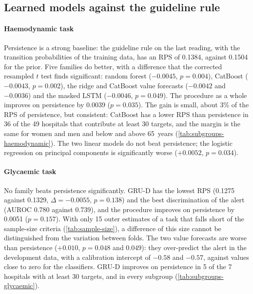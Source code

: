 


\subsection{Learned models against the guideline rule}

\paragraph{Haemodynamic task} Persistence is a strong baseline: the guideline rule on the last reading, with the transition probabilities of the training data, has an RPS of 0.1384, against 0.1504 for the prior. Five families do better, with a difference that the corrected resampled $t$ test finds significant: random forest ($-0.0045$, $p = 0.004$), CatBoost ($-0.0043$, $p = 0.002$), the ridge and CatBoost value forecasts ($-0.0042$ and $-0.0036$) and the masked LSTM ($-0.0046$, $p = 0.049$). The procedure as a whole improves on persistence by 0.0039 ($p = 0.035$). The gain is small, about 3\% of the RPS of persistence, but consistent: CatBoost has a lower RPS than persistence in 36 of the 49 hospitals that contribute at least 30 targets, and the margin is the same for women and men and below and above 65~years (\cref{tab:subgroups-haemodynamic}). The two linear models do not beat persistence; the logistic regression on principal components is significantly worse ($+0.0052$, $p = 0.034$).

\paragraph{Glycaemic task} No family beats persistence significantly. GRU-D has the lowest RPS (0.1275 against 0.1329, $\Delta = -0.0055$, $p = 0.138$) and the best discrimination of the alert (AUROC 0.780 against 0.739), and the procedure improves on persistence by 0.0051 ($p = 0.157$). With only 15 outer estimates of a task that falls short of the sample-size criteria (\cref{tab:sample-size}), a difference of this size cannot be distinguished from the variation between folds. The two value forecasts are worse than persistence ($+0.010$, $p = 0.048$ and $0.049$): they over-predict the alert in the development data, with a calibration intercept of $-0.58$ and $-0.57$, against values close to zero for the classifiers. GRU-D improves on persistence in 5 of the 7 hospitals with at least 30 targets, and in every subgroup (\cref{tab:subgroups-glycaemic}).

